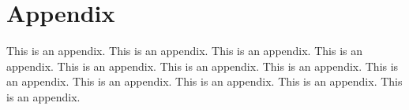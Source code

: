 
\chapter{Appendix}

This is an appendix. This is an appendix. This is an appendix. This is an appendix.
This is an appendix. This is an appendix. This is an appendix. This is an appendix. 
This is an appendix. This is an appendix. This is an appendix. This is an appendix.
